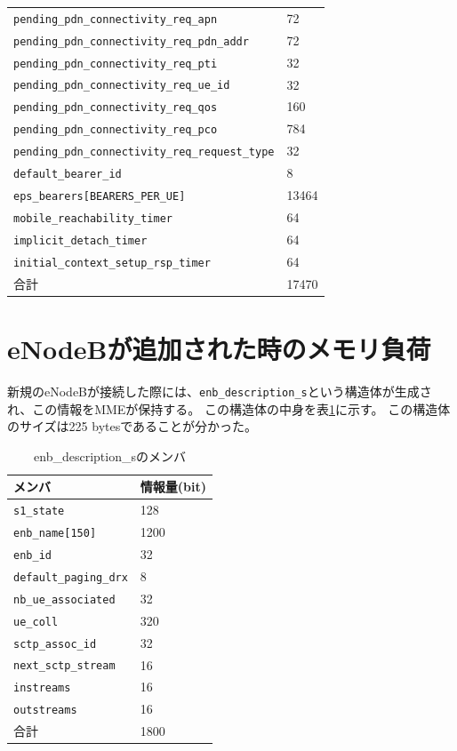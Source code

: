 \documentclass[a4j]{ujarticle}
\begin{document}
\begin{table}[htbp]
\begin{tabular}{l|l}
    \verb|pending_pdn_connectivity_req_apn| & 72\\
    \verb|pending_pdn_connectivity_req_pdn_addr| & 72\\
    \verb|pending_pdn_connectivity_req_pti| & 32\\
    \verb|pending_pdn_connectivity_req_ue_id| & 32\\
    \verb|pending_pdn_connectivity_req_qos| & 160\\
    \verb|pending_pdn_connectivity_req_pco| & 784\\
    \verb|pending_pdn_connectivity_req_request_type| & 32\\
    \verb|default_bearer_id| & 8\\
    \verb|eps_bearers[BEARERS_PER_UE]| & 13464\\
    \verb|mobile_reachability_timer| & 64\\
    \verb|implicit_detach_timer| & 64\\
    \verb|initial_context_setup_rsp_timer| & 64\\\hline%
    合計  & 17470\\\hline
  \end{tabular}
\end{table}
\clearpage


\section{eNodeBが追加された時のメモリ負荷}
新規のeNodeBが接続した際には、\verb|enb_description_s|という構造体が生成され、この情報をMMEが保持する。
この構造体の中身を表\ref{table:oai_source_enb_description_s}に示す。
この構造体のサイズは225 bytesであることが分かった。
\begin{table}[htbp]
  \centering
  \caption{enb\_description\_sのメンバ}
  \label{table:oai_source_enb_description_s}
  \begin{tabular}{l|l}
    \hline
    メンバ & 情報量(bit) \\ \hline \hline
    \verb|s1_state| & 128\\
    \verb|enb_name[150]| & 1200\\
    \verb|enb_id| & 32\\
    \verb|default_paging_drx| & 8\\
    \verb|nb_ue_associated| & 32\\ %
    \verb|ue_coll| & 320\\
    \verb|sctp_assoc_id| & 32\\
    \verb|next_sctp_stream| & 16\\
    \verb|instreams| & 16\\
    \verb|outstreams| & 16\\ \hline %
    合計  & 1800\\\hline
  \end{tabular}
\end{table}
\end{document}
